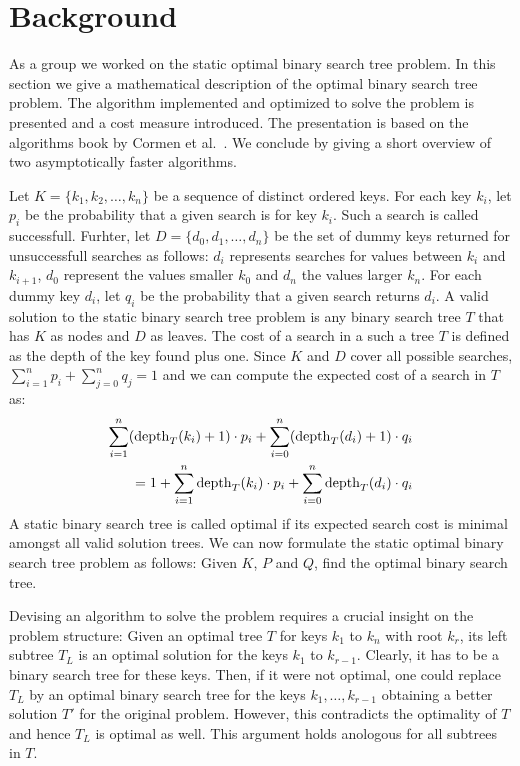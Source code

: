 \section{Background}

As a group we worked on the static optimal binary search tree problem.
In this section we give a mathematical description of the optimal binary
search tree problem. The algorithm implemented and optimized to solve the
problem is presented and a cost measure introduced. The presentation is
based on the algorithms book by Cormen et al.~\cite{MITBook}. We conclude
by giving a short overview of two asymptotically faster algorithms.

 Let $K = \{k_1, k_2, \dots, k_n\}$ be a sequence
of distinct ordered keys. For each key $k_i$, let $p_i$ be the probability
that a given search is for key $k_i$. Such a search is called successfull.
Furhter, let $D = \{d_0, d_1, \dots, d_n\}$ be the set of dummy keys
returned for unsuccessfull searches as follows: $d_i$ represents searches
for values between $k_i$ and $k_{i+1}$, $d_0$ represent the values smaller
$k_0$ and $d_n$ the values larger $k_n$. For each dummy key $d_i$, let
$q_i$ be the probability that a given search returns $d_i$.
A valid solution to the static binary search tree problem is any binary
search tree $T$ that has $K$ as nodes and $D$ as leaves.
The cost of a search in a such a tree $T$ is defined as the depth of the key
found plus one. Since $K$ and $D$ cover all possible searches,
$\sum_{i=1}^n p_i + \sum_{j=0}^n q_j = 1$ and we can compute the expected
cost of a search in $T$ as:
\begin{align}
  \sum_{i=1}^n (\operatorname{depth}_T(k_i) + 1) \cdot p_i
   + \sum_{i=0}^n (\operatorname{depth}_T(d_i) + 1) \cdot q_i
  \nonumber\\
  = 1 + \sum_{i=1}^n \operatorname{depth}_T(k_i) \cdot p_i
      + \sum_{i=0}^n \operatorname{depth}_T(d_i) \cdot q_i
  \label{eqn:cost}
\end{align}
A static binary search tree is called optimal if its expected search cost
is minimal amongst all valid solution trees.
We can now formulate the static optimal binary search tree problem as
follows: Given $K$, $P$ and $Q$, find the optimal binary search tree.

 Devising an algorithm to solve the problem requires a
crucial insight on the problem structure: Given an optimal tree $T$ for
keys $k_1$ to $k_n$ with root $k_r$, its left subtree $T_L$ is an optimal
solution for the keys $k_1$ to $k_{r-1}$. Clearly, it has to be a binary
search tree for these keys. Then, if it were not optimal, one could replace
$T_L$ by an optimal binary search tree for the keys $k_1,\dots,k_{r-1}$
obtaining a better solution $T'$ for the original problem. However, this
contradicts the optimality of $T$ and hence $T_L$ is optimal as well. This
argument holds anologous for all subtrees in $T$.

